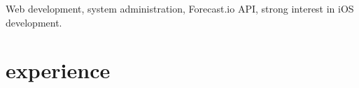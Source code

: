\documentclass[]{cv-style} %
\begin{document}
Web development, system administration, Forecast.io API, strong interest in iOS development.


\section{experience}

%
%
%
%
\end{document}
